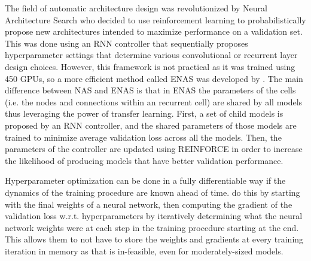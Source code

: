\documentclass{article}
\begin{document}
The field of automatic architecture design was revolutionized by Neural Architecture Search \citep{Zoph} who decided to use reinforcement learning to probabilistically propose new architectures intended to maximize performance on a validation set.
This was done using an RNN controller that sequentially proposes hyperparameter settings that determine various convolutional or recurrent layer design choices.
However, this framework is not practical as it was trained using 450 GPUs, so a more efficient method called ENAS was developed by \citep{pham2018efficient}.
The main difference between NAS and ENAS is that in ENAS the parameters of the cells (i.e. the nodes and connections within an recurrent cell) are shared by all models thus leveraging the power of transfer learning.
First, a set of child models is proposed by an RNN controller, and the shared parameters of those models are trained to minimize average validation loss across all the models.
Then, the parameters of the controller are updated using REINFORCE in order to increase the likelihood of producing models that have better validation performance.

Hyperparameter optimization can be done in a fully differentiable way if the dynamics of the training procedure are known ahead of time.
\citep{maclaurin2015gradient} do this by starting with the final weights of a neural network, then computing the gradient of the validation loss w.r.t. hyperparameters by iteratively determining what the neural network weights were at each step in the training procedure starting at the end.
This allows them to not have to store the weights and gradients at every training iteration in memory as that is in-feasible, even for moderately-sized models.

\end{document}
